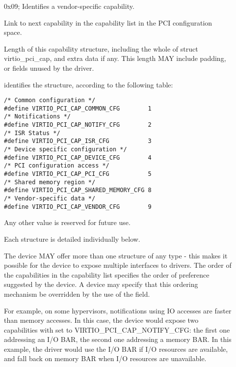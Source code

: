 \begin{description}
\item[]
        0x09; Identifies a vendor-specific capability.

\item[]
        Link to next capability in the capability list in the PCI configuration space.

\item[]
        Length of this capability structure, including the whole of
        struct virtio_pci_cap, and extra data if any.
        This length MAY include padding, or fields unused by the driver.

\item[]
        identifies the structure, according to the following table:

\begin{lstlisting}
/* Common configuration */
#define VIRTIO_PCI_CAP_COMMON_CFG        1
/* Notifications */
#define VIRTIO_PCI_CAP_NOTIFY_CFG        2
/* ISR Status */
#define VIRTIO_PCI_CAP_ISR_CFG           3
/* Device specific configuration */
#define VIRTIO_PCI_CAP_DEVICE_CFG        4
/* PCI configuration access */
#define VIRTIO_PCI_CAP_PCI_CFG           5
/* Shared memory region */
#define VIRTIO_PCI_CAP_SHARED_MEMORY_CFG 8
/* Vendor-specific data */
#define VIRTIO_PCI_CAP_VENDOR_CFG        9
\end{lstlisting}

        Any other value is reserved for future use.

        Each structure is detailed individually below.

        The device MAY offer more than one structure of any type - this makes it
        possible for the device to expose multiple interfaces to drivers.  The order of
        the capabilities in the capability list specifies the order of preference
        suggested by the device.  A device may specify that this ordering mechanism be
        overridden by the use of the  field.
        \begin{note}
          For example, on some hypervisors, notifications using IO accesses are
        faster than memory accesses. In this case, the device would expose two
        capabilities with  set to VIRTIO_PCI_CAP_NOTIFY_CFG:
        the first one addressing an I/O BAR, the second one addressing a memory BAR.
        In this example, the driver would use the I/O BAR if I/O resources are available, and fall back on
        memory BAR when I/O resources are unavailable.
        \end{note}


\end{description}
